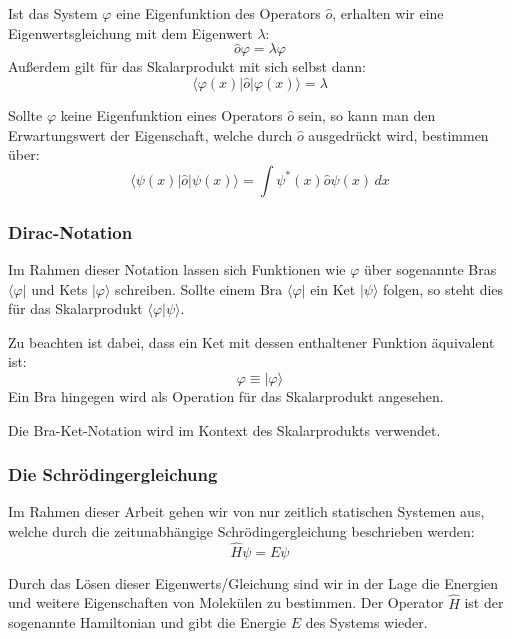 Ist das System $\varphi$ eine Eigenfunktion des Operators $\hat{o}$,
erhalten wir eine Eigenwertsgleichung mit dem Eigenwert $\lambda$:
\begin{equation}
    \hat{o} \varphi = \lambda \varphi
\end{equation}
Außerdem gilt für das Skalarprodukt mit sich selbst dann:
\begin{equation}
    \langle \varphi(x) \vert \hat{o} \vert \varphi(x) \rangle = \lambda
\end{equation}


Sollte $\varphi$ keine Eigenfunktion eines Operators $\hat{o}$ sein,
so kann man den Erwartungswert der Eigenschaft, welche durch $\hat{o}$ ausgedrückt wird, bestimmen über:
\begin{equation}
\langle \psi(x) \vert \hat{o} \vert \psi(x) \rangle
  = \int \psi^*(x) \hat{o} \psi(x) \,dx
\end{equation}

\cite[S. 21]{atkins_friedman_2011}
\cite[S. 155-156]{levine_2019}

\subsubsection{Dirac-Notation}
Im Rahmen dieser Notation lassen sich Funktionen wie $\varphi$
über sogenannte Bras $\langle \varphi \vert$ und Kets $\vert \varphi \rangle$ schreiben.
Sollte einem Bra $\langle \varphi \vert$ ein Ket $\vert \psi \rangle$ folgen,
so steht dies für das Skalarprodukt $\langle \varphi \vert \psi \rangle$.

Zu beachten ist dabei, dass ein Ket mit dessen enthaltener Funktion äquivalent ist:
\begin{equation}
    \varphi \equiv \vert \varphi \rangle
\end{equation}
Ein Bra hingegen wird als Operation für das Skalarprodukt angesehen.

Die Bra-Ket-Notation wird im Kontext des Skalarprodukts verwendet.
\subsubsection{Die Schrödingergleichung}
Im Rahmen dieser Arbeit gehen wir von nur zeitlich statischen Systemen aus,
welche durch die zeitunabhängige Schrödingergleichung beschrieben werden:
\begin{equation}\label{schroedinger}
  \hat{H}\psi = E\psi
\end{equation}

Durch das Lösen dieser Eigenwerts\-/Gleichung sind wir in der Lage
die Energien und weitere Eigenschaften von Molekülen zu bestimmen.
Der Operator $\hat{H}$ ist der sogenannte Hamiltonian und
gibt die Energie $E$ des Systems wieder.

\cite[S. 24-25]{atkins_friedman_2011}